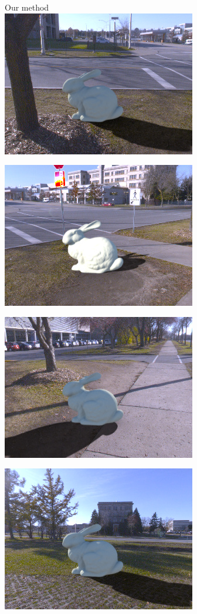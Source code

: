 \begin{minipage}{\linewidth}
\begin{multicols}{4}

Our method\\

\includegraphics[width=\mywidth]{AG8A2875_Panorama_hdr-corrected_012.jpg}

\includegraphics[width=\mywidth]{AG8A2875_Panorama_hdr-corrected_006.jpg}

\includegraphics[width=\mywidth]{AG8A2875_Panorama_hdr-corrected_010.jpg}

\includegraphics[width=\mywidth]{AG8A2917_Panorama_hdr-corrected_008.jpg}


\end{multicols}
\end{minipage}
